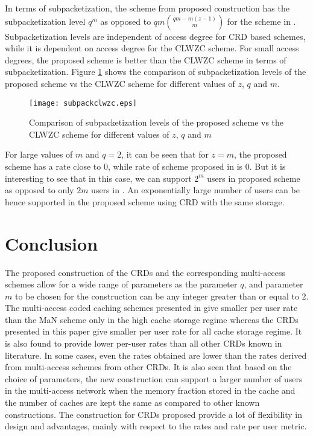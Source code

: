 \documentclass[conference]{IEEEtran}
\begin{document}
In terms of subpacketization, the scheme from proposed construction has the subpacketization level $q^m$ as opposed to $ qm\binom{qm - m(z-1)}{m}$ for the scheme in \cite{CLWZC}.
Subpacketization levels are independent of access degree for CRD based schemes, while it is dependent on access degree for the CLWZC scheme. For small access degrees, the proposed scheme is better than the CLWZC scheme in terms of subpacketization. Figure \ref{fig6} shows the comparison of subpacketization levels of the proposed scheme vs the CLWZC scheme for different values of $z$, $q$ and $m$.
\begin{figure}
	\texttt{[image: subpackclwzc.eps]}
	\begin{center}
		\caption {Comparison of subpacketization levels of the proposed scheme vs the CLWZC scheme for different values of $z$, $q$ and $m$}
		\label{fig6}
	\end{center}
\end{figure} 
For large values of $m$ and $q = 2$, it can be seen that for $z = m$, the proposed scheme has a rate close to $0$, while rate of scheme proposed in \cite{CLWZC} is $0$. But it is interesting to see that in this case, we can support $2^m$ users in proposed scheme as opposed to only $2m$ users in \cite{CLWZC}. An exponentially large number of users can be hence supported in the proposed scheme using CRD with the same storage.

	\section{Conclusion}
	The proposed construction of the  CRDs and the corresponding  multi-access schemes allow for a wide range of parameters as the parameter $q$, and parameter $m$ to be chosen for the construction can be any integer greater than or equal to 2.  The multi-access coded caching schemes presented in \cite{KNRarXiv} give smaller per user rate than the MaN scheme only in the high cache storage regime whereas the CRDs presented in this paper give smaller per user rate for all cache storage regime. It is also found to provide lower per-user rates than all other CRDs known in literature. In some cases, even the rates obtained are lower than the rates derived from multi-access schemes from other CRDs. It is also seen that based on the choice of parameters, the new construction can support a larger number of users in the multi-access network when the memory fraction stored in the cache and the number of caches are kept the same as compared to other known constructions. The construction for CRDs proposed provide a lot of flexibility in design and advantages, mainly with respect to the rates and rate per user metric.	
\end{document}
